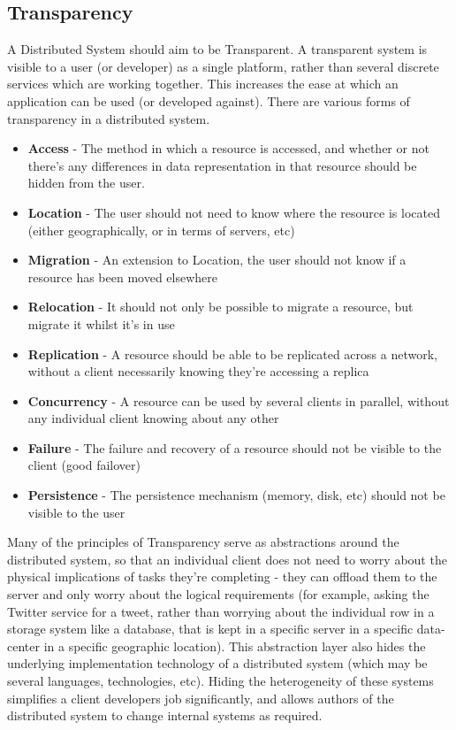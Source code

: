 \documentclass{article}
\begin{document}
\subsection{Transparency}
A Distributed System should aim to be Transparent. A transparent system is visible to a user (or developer) as a single platform, rather than several discrete services which are working together. This increases the ease at which an application can be used (or developed against). There are various forms of transparency in a distributed system.
\begin{itemize}
    \item \textbf{Access} - The method in which a resource is accessed, and whether or not there's any differences in data representation in that resource should be hidden from the user.
    \item \textbf{Location} - The user should not need to know where the resource is located (either geographically, or in terms of servers, etc)
    \item \textbf{Migration} - An extension to Location, the user should not know if a resource has been moved elsewhere
    \item \textbf{Relocation} - It should not only be possible to migrate a resource, but migrate it whilst it's in use
    \item \textbf{Replication} - A resource should be able to be replicated across a network, without a client necessarily knowing they're accessing a replica
    \item \textbf{Concurrency} - A resource can be used by several clients in parallel, without any individual client knowing about any other
    \item \textbf{Failure} - The failure and recovery of a resource should not be visible to the client (good failover)
    \item \textbf{Persistence} - The persistence mechanism (memory, disk, etc) should not be visible to the user
\end{itemize}

Many of the principles of Transparency serve as abstractions around the distributed system, so that an individual client does not need to worry about the physical implications of tasks they're completing - they can offload them to the server and only worry about the logical requirements (for example, asking the Twitter service for a tweet, rather than worrying about the individual row in a storage system like a database, that is kept in a specific server in a specific data-center in a specific geographic location). This abstraction layer also hides the underlying implementation technology of a distributed system (which may be several languages, technologies, etc). Hiding the heterogeneity of these systems simplifies a client developers job significantly, and allows authors of the distributed system to change internal systems as required. 
\end{document}
